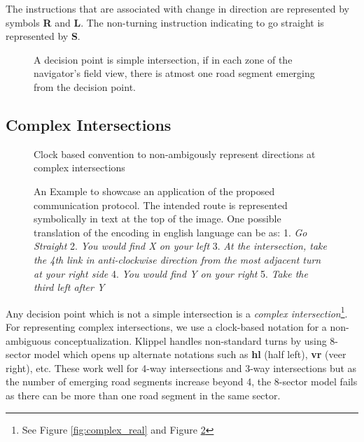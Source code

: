 \documentclass{iitkthesis}
\begin{document}
The instructions that are associated with change in direction are represented by symbols \textbf{R} and \textbf{L}. The non-turning instruction indicating to go straight is represented by \textbf{S}. 

\begin{figure}
\centering
\caption{A decision point is simple intersection, if in each zone of the navigator's field view, there is atmost one road segment emerging from the decision point.}
\label{fig:simpleturns}
 \end{figure}
\subsection{Complex Intersections}
\begin{figure}
\centering
\caption{Clock based convention to non-ambigously represent directions at complex intersections}
\label{fig:complex}
 \end{figure}
\begin{figure}
\centering
\caption{An Example to showcase an application of the proposed communication protocol. The intended route is represented symbolically in text at the top of the image. One possible translation of the encoding in english language can be as: 
1. \textit{Go Straight}
2. \textit{You would find X on your left}
3. \textit{At the intersection, take the 4th link in anti-clockwise direction from the most adjacent turn at your right side} 
4. \textit{You would find Y on your right}
5. \textit{Take the third left after Y}
}
\label{fig:complexex}
 \end{figure} 
Any decision point which is not a simple intersection is a \textit{complex intersection}\footnote{See Figure \ref{fig:complex_real} and Figure \ref{fig:complex}}. For representing complex intersections, we use a clock-based notation for a non-ambiguous conceptualization. Klippel \cite{klippel} handles non-standard turns by using 8-sector model which opens up alternate notations such as \textbf{hl} (half left), \textbf{vr} (veer right), etc. These work well for 4-way intersections and 3-way intersections but as the number of emerging road segments increase beyond 4, the 8-sector model fails as there can be more than one road segment in the same sector.
\end{document}

